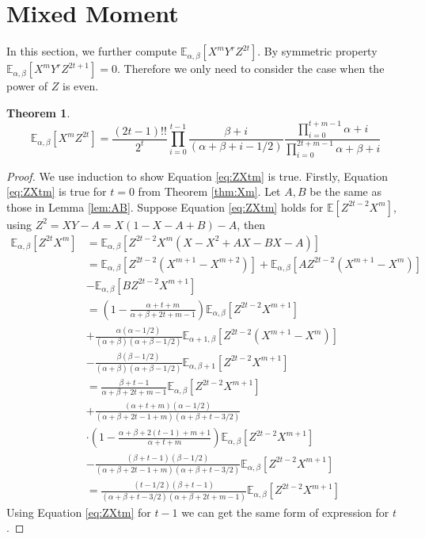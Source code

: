 \documentclass{elsarticle}
\newtheorem{theorem}{Theorem}
\def\E{\mathbb{E}}
\begin{document}
\section{Mixed Moment}
In this section, we further compute $\E_{\alpha,\beta}[X^mY^rZ^{2t}]$.
By symmetric property  $\E_{\alpha,\beta}[X^mY^rZ^{2t+1}] = 0$.
Therefore we only need to consider the case when the power of $Z$
is even.
\begin{theorem}\label{thm:mm}
	\begin{equation}\label{eq:ZXtm}
	\E_{\alpha, \beta}[X^mZ^{2t}] = \frac{(2t-1)!!}{2^t}
	\prod_{i=0}^{t-1}
	\frac{\beta+i}{(\alpha+\beta+i-1/2)}
	\frac{\prod_{i=0}^{t+m-1}\alpha+i}{\prod_{i=0}^{2t+m-1}
		\alpha+\beta+i}
	\end{equation}
\end{theorem}
\begin{proof}
	We use induction to show Equation \eqref{eq:ZXtm} is true.
	Firstly, Equation \eqref{eq:ZXtm} is true for $t=0$ from 
	Theorem \ref{thm:Xm}. Let $A, B$ be the same as those
	in Lemma \ref{lem:AB}.
	Suppose Equation \eqref{eq:ZXtm} holds for $\E[Z^{2t-2}X^m]$,
	using $Z^2=XY-A=X(1-X-A+B)-A$, then
	\begin{align*}
	\E_{\alpha,\beta}[Z^{2t}X^m] &=
	\E_{\alpha,\beta}[Z^{2t-2}X^m(X-X^2+AX-BX-A)] \\
	&= \E_{\alpha,\beta}[Z^{2t-2}(X^{m+1} - X^{m+2})] +
	\E_{\alpha,\beta}[A Z^{2t-2} (X^{m+1} - X^m)] \\
	&-
	\E_{\alpha,\beta}[BZ^{2t-2} X^{m+1}] \\
	&= \left(1-\frac{\alpha+t+m}{\alpha+\beta+2t+m-1}
	\right)\E_{\alpha, \beta}[Z^{2t-2}X^{m+1}] \\
	&+
	\frac{\alpha(\alpha-1/2)}{(\alpha+\beta)(\alpha+\beta-1/2)}
	\E_{\alpha+1,\beta}[Z^{2t-2}(X^{m+1} - X^m)] \\
	&-\frac{\beta(\beta-1/2)}{(\alpha+\beta)(\alpha+\beta-1/2)}
	\E_{\alpha,\beta+1}[Z^{2t-2}X^{m+1}]\\
	&=\frac{\beta+t-1}{\alpha+\beta + 2t+m-1}
	\E_{\alpha,\beta}[Z^{2t-2}X^{m+1}] \\
	&+\frac{(\alpha+t+m)(\alpha-1/2)}{(\alpha+\beta+2t-1+m)(\alpha+\beta + t - 3/2)}\\
	&\cdot
	\left(1-\frac{\alpha+\beta+2(t-1)+m+1}{\alpha+t+m}\right)
	\E_{\alpha, \beta}[Z^{2t-2}X^{m+1}] \\
	&-\frac{(\beta+t-1)(\beta-1/2)}{(\alpha+\beta+2t-1+m)(\alpha+\beta + t - 3/2)}
	\E_{\alpha,\beta}[Z^{2t-2}X^{m+1}]\\
	&=\frac{(t-1/2)(\beta+t-1)}{(\alpha+\beta+t-3/2)(\alpha+\beta+2t+m-1)}
	\E_{\alpha, \beta}[Z^{2t-2}X^{m+1}]
	\end{align*}
	Using Equation \eqref{eq:ZXtm} for $t-1$
	we can get the same form of expression for $t$.
\end{proof}
\end{document}
